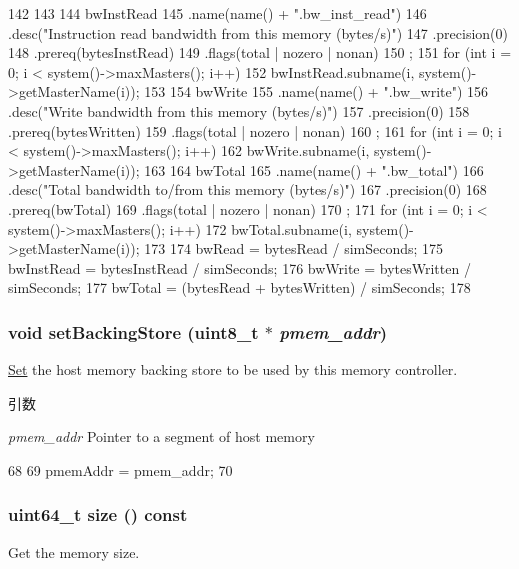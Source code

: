 \begin{DoxyCode}
{{142     }
143 
144     bwInstRead
145         .name(name() + ".bw_inst_read")
146         .desc("Instruction read bandwidth from this memory (bytes/s)")
147         .precision(0)
148         .prereq(bytesInstRead)
149         .flags(total | nozero | nonan)
150         ;
151     for (int i = 0; i < system()->maxMasters(); i++) {
152         bwInstRead.subname(i, system()->getMasterName(i));
153     }
154     bwWrite
155         .name(name() + ".bw_write")
156         .desc("Write bandwidth from this memory (bytes/s)")
157         .precision(0)
158         .prereq(bytesWritten)
159         .flags(total | nozero | nonan)
160         ;
161     for (int i = 0; i < system()->maxMasters(); i++) {
162         bwWrite.subname(i, system()->getMasterName(i));
163     }
164     bwTotal
165         .name(name() + ".bw_total")
166         .desc("Total bandwidth to/from this memory (bytes/s)")
167         .precision(0)
168         .prereq(bwTotal)
169         .flags(total | nozero | nonan)
170         ;
171     for (int i = 0; i < system()->maxMasters(); i++) {
172         bwTotal.subname(i, system()->getMasterName(i));
173     }
174     bwRead = bytesRead / simSeconds;
175     bwInstRead = bytesInstRead / simSeconds;
176     bwWrite = bytesWritten / simSeconds;
177     bwTotal = (bytesRead + bytesWritten) / simSeconds;
178 }
\end{DoxyCode}
\hypertarget{classAbstractMemory_a2651a6edea3b7884410b1abefac8b2de}{
\subsubsection[{setBackingStore}]{\setlength{\rightskip}{0pt plus 5cm}void setBackingStore (uint8\_\-t $\ast$ {\em pmem\_\-addr})}}
\label{classAbstractMemory_a2651a6edea3b7884410b1abefac8b2de}
\hyperlink{classSet}{Set} the host memory backing store to be used by this memory controller.


\begin{DoxyParams}{引数}
\item[{\em pmem\_\-addr}]Pointer to a segment of host memory \end{DoxyParams}



\begin{DoxyCode}
68 {
69     pmemAddr = pmem_addr;
70 }
\end{DoxyCode}
\hypertarget{classAbstractMemory_a0b6868dbef44fc07f11d050eb59e5f7e}{
\subsubsection[{size}]{\setlength{\rightskip}{0pt plus 5cm}uint64\_\-t size () const}}
\label{classAbstractMemory_a0b6868dbef44fc07f11d050eb59e5f7e}
Get the memory size.

